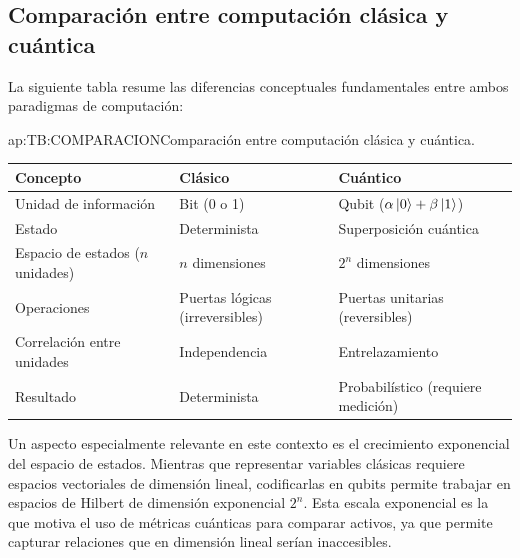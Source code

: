 \subsection{Comparación entre computación clásica y cuántica}
\label{ap:subsec:comparacionclasicacuantica}

La siguiente tabla resume las diferencias conceptuales fundamentales entre ambos paradigmas de computación:

\begin{table}[Comparación clásica vs cuántica]{ap:TB:COMPARACION}{Comparación entre computación clásica y cuántica.}
	\begin{tabular}{lll}
		\hline
		\textbf{Concepto} & \textbf{Clásico} & \textbf{Cuántico} \\
		\hline \hline
		Unidad de información & Bit (0 o 1) & Qubit ($\alpha\ket{0} + \beta\ket{1}$) \\
		Estado & Determinista & Superposición cuántica \\
		Espacio de estados ($n$ unidades) & $n$ dimensiones & $2^n$ dimensiones \\
		Operaciones & Puertas lógicas (irreversibles) & Puertas unitarias (reversibles) \\
		Correlación entre unidades & Independencia & Entrelazamiento \\
		Resultado & Determinista & Probabilístico (requiere medición) \\
		\hline
	\end{tabular}
\end{table}

Un aspecto especialmente relevante en este contexto es el crecimiento exponencial del espacio de estados. Mientras que representar variables clásicas requiere espacios vectoriales de dimensión lineal, codificarlas en qubits permite trabajar en espacios de Hilbert de dimensión exponencial $2^n$. Esta escala exponencial es la que motiva el uso de métricas cuánticas para comparar activos, ya que permite capturar relaciones que en dimensión lineal serían inaccesibles.

